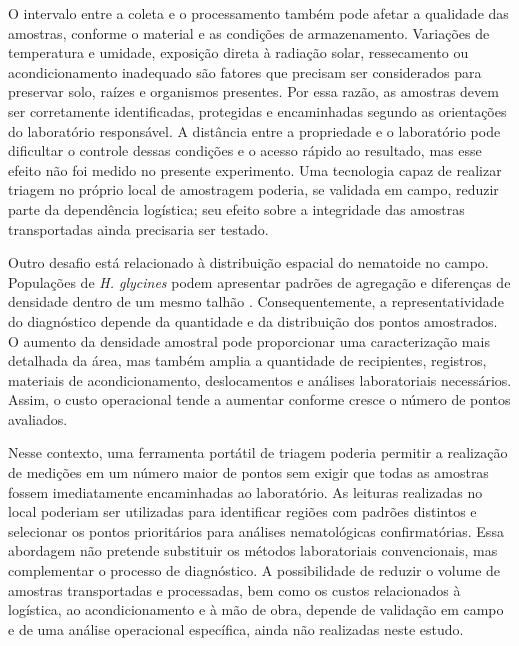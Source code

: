 O intervalo entre a coleta e o processamento também pode afetar a qualidade das amostras, conforme o material e as condições de armazenamento. Variações de temperatura e umidade, exposição direta à radiação solar, ressecamento ou acondicionamento inadequado são fatores que precisam ser considerados para preservar solo, raízes e organismos presentes. Por essa razão, as amostras devem ser corretamente identificadas, protegidas e encaminhadas segundo as orientações do laboratório responsável. A distância entre a propriedade e o laboratório pode dificultar o controle dessas condições e o acesso rápido ao resultado, mas esse efeito não foi medido no presente experimento. Uma tecnologia capaz de realizar triagem no próprio local de amostragem poderia, se validada em campo, reduzir parte da dependência logística; seu efeito sobre a integridade das amostras transportadas ainda precisaria ser testado.

Outro desafio está relacionado à distribuição espacial do nematoide no campo. Populações de \textit{H. glycines} podem apresentar padrões de agregação e diferenças de densidade dentro de um mesmo talhão \cite{avendano2003,poromarto2019}. Consequentemente, a representatividade do diagnóstico depende da quantidade e da distribuição dos pontos amostrados. O aumento da densidade amostral pode proporcionar uma caracterização mais detalhada da área, mas também amplia a quantidade de recipientes, registros, materiais de acondicionamento, deslocamentos e análises laboratoriais necessários. Assim, o custo operacional tende a aumentar conforme cresce o número de pontos avaliados.

Nesse contexto, uma ferramenta portátil de triagem poderia permitir a realização de medições em um número maior de pontos sem exigir que todas as amostras fossem imediatamente encaminhadas ao laboratório. As leituras realizadas no local poderiam ser utilizadas para identificar regiões com padrões distintos e selecionar os pontos prioritários para análises nematológicas confirmatórias. Essa abordagem não pretende substituir os métodos laboratoriais convencionais, mas complementar o processo de diagnóstico. A possibilidade de reduzir o volume de amostras transportadas e processadas, bem como os custos relacionados à logística, ao acondicionamento e à mão de obra, depende de validação em campo e de uma análise operacional específica, ainda não realizadas neste estudo.

